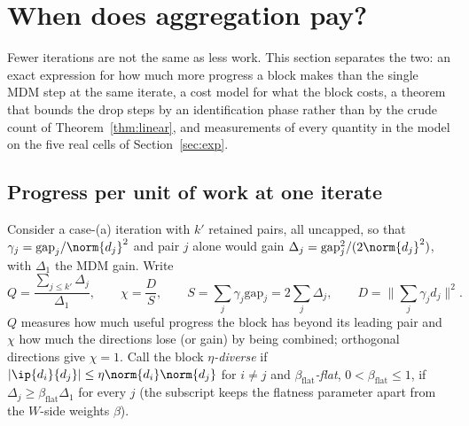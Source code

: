 \section{When does aggregation pay?}\label{sec:pay}

Fewer iterations are not the same as less work. This section separates
the two: an exact expression for how much more progress a block makes
than the single MDM step at the same iterate, a cost model for what the
block costs, a theorem that bounds the drop steps by an identification
phase rather than by the crude count of Theorem~\ref{thm:linear}, and
measurements of every quantity in the model on the five real cells of
Section~\ref{sec:exp}.

\subsection{Progress per unit of work at one iterate}

Consider a case-(a) iteration with $k'$ retained pairs, all uncapped,
so that $\gamma_j=\mathrm{gap}_j/\norm{d_j}^2$ and pair $j$ alone would
gain $\Delta_j=\mathrm{gap}_j^2/(2\norm{d_j}^2)$, with $\Delta_1$ the MDM
gain. Write
\[
Q=\frac{\sum_{j\le k'}\Delta_j}{\Delta_1},\qquad
\chi=\frac{D}{S},\qquad
S=\sum_j\gamma_j\mathrm{gap}_j=2\sum_j\Delta_j,\qquad
D=\Big\lVert\sum_j\gamma_jd_j\Big\rVert^2 .
\]
$Q$ measures how much useful progress the block has beyond its leading
pair and $\chi$ how much the directions lose (or gain) by being
combined; orthogonal directions give $\chi=1$. Call the block
\emph{$\eta$-diverse} if $|\ip{d_i}{d_j}|\le\eta\norm{d_i}\norm{d_j}$ for
$i\ne j$ and \emph{$\beta_{\mathrm{flat}}$-flat}, $0<\beta_{\mathrm{flat}}\le1$, if
$\Delta_j\ge\beta_{\mathrm{flat}}\Delta_1$ for every $j$ (the subscript keeps
the flatness parameter apart from the $W$-side weights $\beta$).


